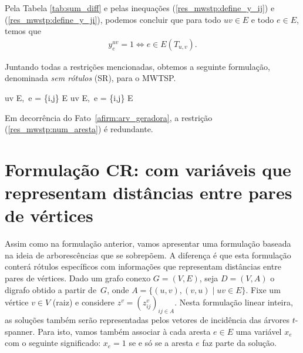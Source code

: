Pela Tabela \ref{tab:sum_diff} e pelas inequações
(\ref{res_mwstp:define_y_ij}) e (\ref{res_mwstp:define_y_ji}), podemos
concluir que para todo $uv \in E$ e todo $e \in E$, temos que
%
\begin{align}
  \label{afirm:valor_y}
  y^{uv}_e = 1 \Leftrightarrow e \in E(T_{u,v}).
\end{align}


Juntando todas a restrições mencionadas, obtemos a seguinte
formulação, denominada \emph{sem rótulos} (SR), para o MWTSP.

  \begin{lpformulation}[{\rm (PA)}]
     {uv \in E,\, \forall e = \{i,j\} \in E}
     {uv \in E,\, \forall e = \{i,j\} \in E}
\end{lpformulation}

\smallskip

Em decorrência do Fato~\ref{afirm:arv_geradora}, a restrição
(\ref{res_mwstp:num_aresta}) é redundante.


\section{Formulação CR: com variáveis que representam distâncias entre pares de vértices}
\label{sec:form_mwstp_lab_dist}
Assim como na formulação anterior, vamos apresentar uma formulação baseada
na ideia de arborescências que se sobrepõem. A diferença é que esta
formulação conterá rótulos específicos com informações que representam
distâncias entre pares de vértices. %
Dado um grafo conexo $G = (V,E)$, seja $D = (V,A)$ o digrafo obtido a
partir de~$G$, onde $A = \{(u,v),(v,u)\; |\; uv \in E\}$.  Fixe um vértice
$v \in V$ (raiz) e considere $z^{v} = (z_{ij}^{v})_{ij \in A}$.
Nesta formulação linear inteira, as soluções também serão 
representadas pelos vetores de incidência das árvores $t$-spanner. Para isto,
vamos também associar à cada aresta $e \in E$ uma variável $x_e$ com o
seguinte significado: $x_e = 1$ se e só se a aresta $e$ faz parte da solução. 

